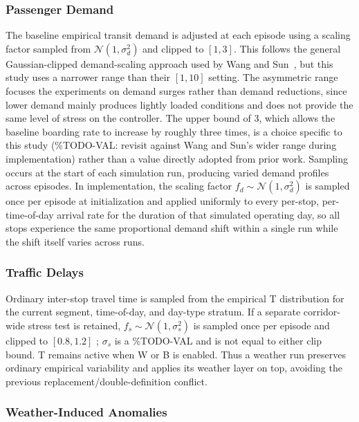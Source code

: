 \subsubsection{Passenger Demand}

The baseline empirical transit demand is adjusted at each episode using a scaling factor sampled from $\mathcal{N}(1, \sigma_d^2)$ and clipped to $[1, 3]$. This follows the general Gaussian-clipped demand-scaling approach used by Wang and Sun~\cite{Wangsun}, but this study uses a narrower range than their $[1, 10]$ setting. The asymmetric range focuses the experiments on demand surges rather than demand reductions, since lower demand mainly produces lightly loaded conditions and does not provide the same level of stress on the controller. The upper bound of 3, which allows the baseline boarding rate to increase by roughly three times, is a choice specific to this study (\%TODO-VAL: revisit against Wang and Sun's wider range during implementation) rather than a value directly adopted from prior work. Sampling occurs at the start of each simulation run, producing varied demand profiles across episodes. In implementation, the scaling factor $f_d \sim \mathcal{N}(1, \sigma_d^2)$ is sampled once per episode at initialization and applied uniformly to every per-stop, per-time-of-day arrival rate for the duration of that simulated operating day, so all stops experience the same proportional demand shift within a single run while the shift itself varies across runs.

\subsubsection{Traffic Delays}

Ordinary inter-stop travel time is sampled from the empirical T distribution for the current segment, time-of-day, and day-type stratum. If a separate corridor-wide stress test is retained, $f_s \sim \mathcal{N}(1,\sigma_s^2)$ is sampled once per episode and clipped to $[0.8,1.2]$ \cite{Wangsun}; $\sigma_s$ is a \%TODO-VAL and is not equal to either clip bound. T remains active when W or B is enabled. Thus a weather run preserves ordinary empirical variability and applies its weather layer on top, avoiding the previous replacement/double-definition conflict.

\subsubsection{Weather-Induced Anomalies}

